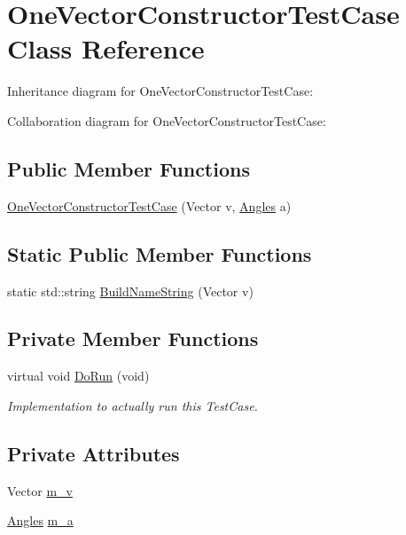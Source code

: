 \hypertarget{classOneVectorConstructorTestCase}{}\section{One\+Vector\+Constructor\+Test\+Case Class Reference}
\label{classOneVectorConstructorTestCase}


Inheritance diagram for One\+Vector\+Constructor\+Test\+Case\+:


Collaboration diagram for One\+Vector\+Constructor\+Test\+Case\+:
\subsection*{Public Member Functions}
\begin{DoxyCompactItemize}
\item 
\hyperlink{classOneVectorConstructorTestCase_ab14af0116cde039b4a021f5eafff5fba}{One\+Vector\+Constructor\+Test\+Case} (Vector v, \hyperlink{structns3_1_1Angles}{Angles} a)
\end{DoxyCompactItemize}
\subsection*{Static Public Member Functions}
\begin{DoxyCompactItemize}
\item 
static std\+::string \hyperlink{classOneVectorConstructorTestCase_af7740e934df1322a2ce9b7a0cd459d73}{Build\+Name\+String} (Vector v)
\end{DoxyCompactItemize}
\subsection*{Private Member Functions}
\begin{DoxyCompactItemize}
\item 
virtual void \hyperlink{classOneVectorConstructorTestCase_aa06cb4b7624af56ea88e12f443dbfca8}{Do\+Run} (void)
\begin{DoxyCompactList}\small\item\em Implementation to actually run this Test\+Case. \end{DoxyCompactList}\end{DoxyCompactItemize}
\subsection*{Private Attributes}
\begin{DoxyCompactItemize}
\item 
Vector \hyperlink{classOneVectorConstructorTestCase_a9ff252032d035cbc50d846b96de7385d}{m\+\_\+v}
\item 
\hyperlink{structns3_1_1Angles}{Angles} \hyperlink{classOneVectorConstructorTestCase_ae16b4068567f80bfd4b5f03e528adb40}{m\+\_\+a}
\end{DoxyCompactItemize}
